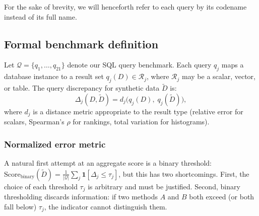 \documentclass[12pt,letterpaper]{article}
\renewcommand{\_}{\textunderscore\allowbreak}
\begin{document}
For the sake of brevity, we will henceforth refer to each query by its codename instead of its full name.

\subsection{Formal benchmark definition}

Let $\mathcal{Q} = \{q_1, \ldots, q_{21}\}$ denote our SQL query benchmark. Each query $q_j$ maps a database instance to a result set $q_j(D) \in \mathcal{R}_j$, where $\mathcal{R}_j$ may be a scalar, vector, or table. The query discrepancy for synthetic data $\tilde{D}$ is:
\begin{equation}
    \Delta_j(D, \tilde{D}) = d_j\bigl(q_j(D),\; q_j(\tilde{D})\bigr),
\end{equation}
where $d_j$ is a distance metric appropriate to the result type (relative error for scalars, Spearman's $\rho$ for rankings, total variation for histograms).

\subsubsection{Normalized error metric}
\label{sec:normalized-error}

A natural first attempt at an aggregate score is a binary threshold:
$\text{Score}_{\text{binary}}(\tilde{D}) = \frac{1}{|\mathcal{Q}|} \sum_j \mathbf{1}[\Delta_j \leq \tau_j]$,
but this has two shortcomings. First, the choice of each threshold $\tau_j$ is arbitrary and must be justified. Second, binary thresholding discards information: if two methods $A$ and $B$ both exceed (or both fall below) $\tau_j$, the indicator cannot distinguish them.
\end{document}
